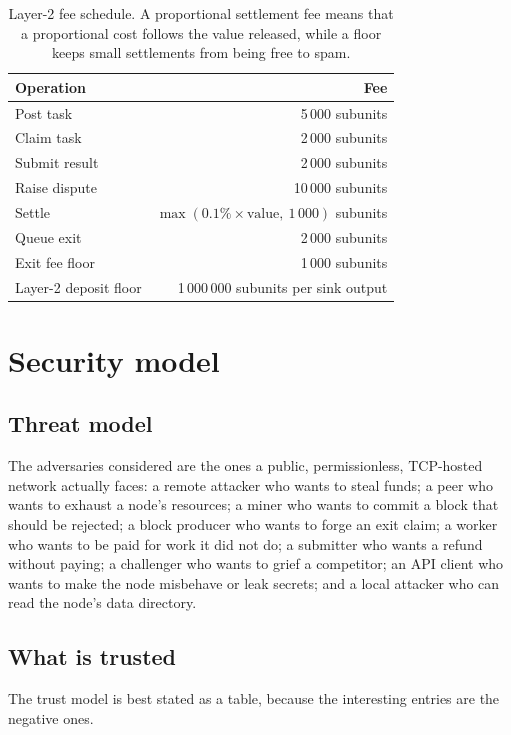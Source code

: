 \documentclass{article}
\begin{document}
\begin{table}[t]
\centering
\begin{tabular}{lr}
\toprule
\textbf{Operation} & \textbf{Fee} \\
\midrule
Post task & 5\,000 subunits \\
Claim task & 2\,000 subunits \\
Submit result & 2\,000 subunits \\
Raise dispute & 10\,000 subunits \\
Settle & $\max(0.1\% \times \text{value},\ 1\,000)$ subunits \\
Queue exit & 2\,000 subunits \\
Exit fee floor & 1\,000 subunits \\
Layer-2 deposit floor & 1\,000\,000 subunits per sink output \\
\bottomrule
\end{tabular}
\caption{Layer-2 fee schedule. A proportional settlement fee means that a
proportional cost follows the value released, while a floor keeps small
settlements from being free to spam.}
\label{tab:fees}
\end{table}


\section{Security model}
\label{sec:security}

\subsection{Threat model}

The adversaries considered are the ones a public, permissionless, TCP-hosted
network actually faces: a remote attacker who wants to steal funds; a peer who
wants to exhaust a node's resources; a miner who wants to commit a block that
should be rejected; a block producer who wants to forge an exit claim; a worker
who wants to be paid for work it did not do; a submitter who wants a refund
without paying; a challenger who wants to grief a competitor; an API client
who wants to make the node misbehave or leak secrets; and a local attacker who
can read the node's data directory.

\subsection{What is trusted}

The trust model is best stated as a table, because the interesting entries are
the negative ones.
\end{document}
